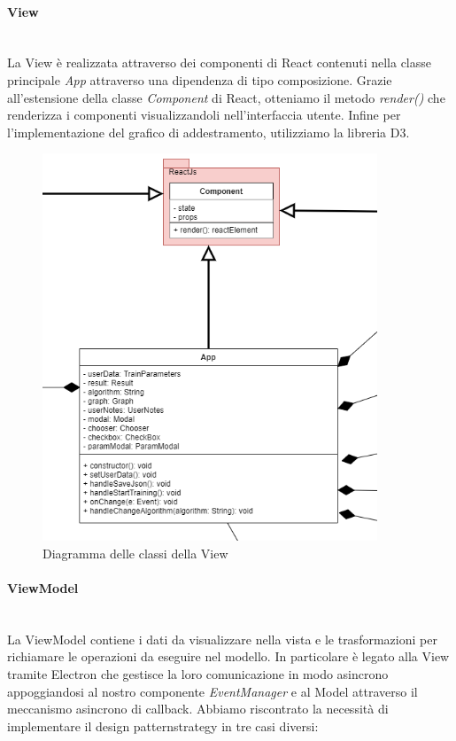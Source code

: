 		\paragraph{View} \mbox{} \\[1mm]
		La View è realizzata attraverso dei componenti di React contenuti nella classe principale \textit{App} attraverso una dipendenza di tipo composizione. Grazie all'estensione della classe \textit{Component} di React, otteniamo il metodo \textit{render()} che renderizza i componenti visualizzandoli nell'interfaccia utente.
		Infine per l'implementazione del grafico di addestramento, utilizziamo la libreria D3.
		\mbox{}
				\begin{figure} [H]
					\begin{center}
						\includegraphics[width=100mm]{img/Diagrammi/view-app.png}
					\end{center}
					\caption{Diagramma delle classi della View}
				\end{figure}
	
		\paragraph{ViewModel} \mbox{} \\[1mm]
		La ViewModel contiene i dati da visualizzare nella vista e le trasformazioni per richiamare le operazioni da eseguire nel modello.
		In particolare è legato alla View tramite Electron che gestisce la loro comunicazione in modo asincrono appoggiandosi al nostro componente \textit{EventManager} e al Model attraverso il meccanismo asincrono di callback.
		Abbiamo riscontrato la necessità di implementare il design pattern\glosp strategy in tre casi diversi:
